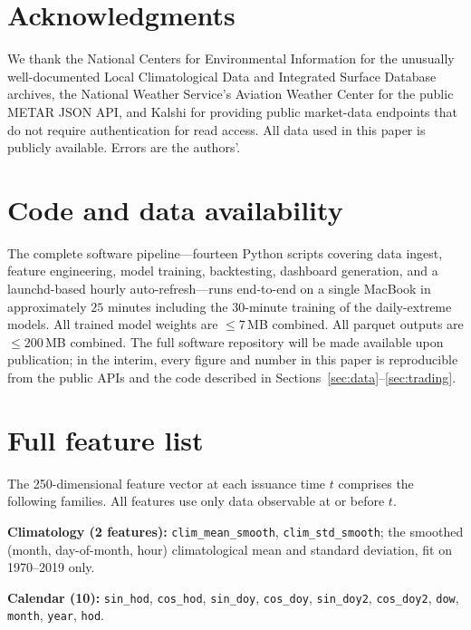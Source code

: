 \documentclass[11pt]{article}
\begin{document}
\section*{Acknowledgments}

We thank the National Centers for Environmental Information for the
unusually well-documented Local Climatological Data and Integrated Surface
Database archives, the National Weather Service's Aviation Weather Center
for the public METAR JSON API, and Kalshi for providing public market-data
endpoints that do not require authentication for read access. All data
used in this paper is publicly available. Errors are the authors'.

\section*{Code and data availability}

The complete software pipeline---fourteen Python scripts covering data
ingest, feature engineering, model training, backtesting, dashboard
generation, and a launchd-based hourly auto-refresh---runs end-to-end on a
single MacBook in approximately $25$ minutes including the $30$-minute
training of the daily-extreme models. All trained model weights are
$\le 7$\,MB combined. All parquet outputs are $\le 200$\,MB combined.
The full software repository will be made available upon publication; in
the interim, every figure and number in this paper is reproducible from
the public APIs and the code described in Sections~\ref{sec:data}--\ref{sec:trading}.



\appendix

\section{Full feature list}
\label{app:features}

The 250-dimensional feature vector at each issuance time $t$ comprises the
following families. All features use only data observable at or before $t$.

\textbf{Climatology (2 features):} \texttt{clim\_mean\_smooth},
\texttt{clim\_std\_smooth}; the smoothed (month, day-of-month, hour)
climatological mean and standard deviation, fit on 1970--2019 only.

\textbf{Calendar (10):} \texttt{sin\_hod}, \texttt{cos\_hod},
\texttt{sin\_doy}, \texttt{cos\_doy}, \texttt{sin\_doy2}, \texttt{cos\_doy2},
\texttt{dow}, \texttt{month}, \texttt{year}, \texttt{hod}.
\end{document}
